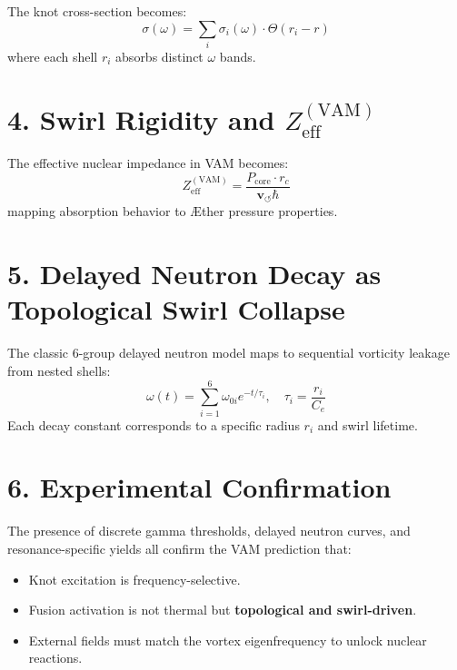 \documentclass{article}
\begin{document}
The knot cross-section becomes:
\[
\sigma(\omega) = \sum_i \sigma_i(\omega) \cdot \Theta(r_i - r)
\]
where each shell $r_i$ absorbs distinct $\omega$ bands.

\section*{4. Swirl Rigidity and $Z_{\mathrm{eff}}^{(\mathrm{VAM})}$}
The effective nuclear impedance in VAM becomes:
\[
Z_{\mathrm{eff}}^{(\mathrm{VAM})} = \frac{P_{\mathrm{core}} \cdot r_c}{\mathbf{v}_{\scriptscriptstyle\boldsymbol{\circlearrowleft}} \hbar}
\]
mapping absorption behavior to Æther pressure properties.

\section*{5. Delayed Neutron Decay as Topological Swirl Collapse}
The classic 6-group delayed neutron model maps to sequential vorticity leakage from nested shells:
\[
\omega(t) = \sum_{i=1}^6 \omega_{0i} e^{-t/\tau_i}, \quad \tau_i = \frac{r_i}{C_e}
\]
Each decay constant corresponds to a specific radius $r_i$ and swirl lifetime.

\section*{6. Experimental Confirmation}
The presence of discrete gamma thresholds, delayed neutron curves, and resonance-specific yields all confirm the VAM prediction that:
\begin{itemize}
  \item Knot excitation is frequency-selective.
  \item Fusion activation is not thermal but \textbf{topological and swirl-driven}.
  \item External fields must match the vortex eigenfrequency to unlock nuclear reactions.
\end{itemize}
\end{document}
